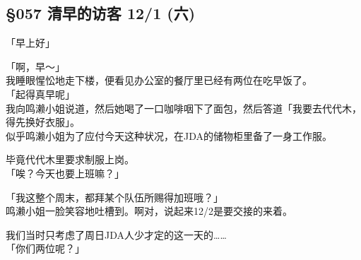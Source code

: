 \subsection{§057 清早的访客 12/1 (六)}

「早上好」

「啊，早～」\\

我睡眼惺忪地走下楼，便看见办公室的餐厅里已经有两位在吃早饭了。\\

「起得真早呢」\\

我向鸣濑小姐说道，然后她喝了一口咖啡咽下了面包，然后答道「我要去代代木，得先换好衣服」。\\

似乎鸣濑小姐为了应付今天这种状况，在JDA的储物柜里备了一身工作服。

毕竟代代木里要求制服上岗。\\

「唉？今天也要上班嘛？」

「我这整个周末，都拜某个队伍所赐得加班哦？」\\

鸣濑小姐一脸笑容地吐槽到。啊对，说起来12/2是要交接的来着。

我们当时只考虑了周日JDA人少才定的这一天的……\\

「你们两位呢？」

